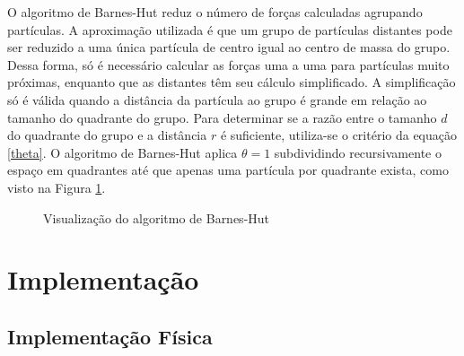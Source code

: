 \documentclass[rel_mlp]{iiufrgs}
\begin{document}
O algoritmo de Barnes-Hut reduz o número de forças calculadas agrupando partículas. A aproximação utilizada é que um grupo de partículas distantes pode ser reduzido a uma única partícula de centro igual ao centro de massa do grupo. Dessa forma, só é necessário calcular as forças uma a uma para partículas muito próximas, enquanto que as distantes têm seu cálculo simplificado. A simplificação só é válida quando a distância da partícula ao grupo é grande em relação ao tamanho do quadrante do grupo. Para determinar se a razão entre o tamanho $d$ do quadrante do grupo e a distância $r$ é suficiente, utiliza-se o critério da equação \eqref{theta}. O algoritmo de Barnes-Hut aplica $\theta=1$ subdividindo recursivamente o espaço em quadrantes até que apenas uma partícula por quadrante exista, como visto na Figura \ref{fig:barneshut.png}.



\begin{figure}[htb]
    \centering
    \caption{Visualização do algoritmo de Barnes-Hut}
    \label{fig:barneshut.png}
\end{figure}


\chapter{Implementação}

\section{Implementação Física}
\end{document}
